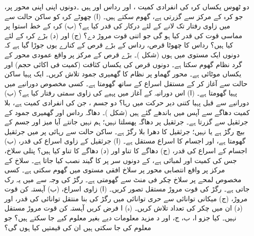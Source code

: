 دو  ٹھوس یکساں کرہ   کی انفرادی کمیت ،  اور رداس  اور  ہیں ۔دونوں اپنی اپنی محور پر، جو کرہ کے مرکز سے گزرتی ہے، گھوم سکتے ہیں۔ (ا)  چھوٹے  کرہ کو ساکن حالت سے   میں  زاوی رفتار تک لانے کے لئے درکار  کی قدر  کیا ہے؟ (ب)  کرہ کے خط استوا  پر مماسی قوت  کی قدر  کیا ہو گی جو اتنی قوت مروڑ دے؟ (ج)  اور (د)  بڑے کرہ کے لئے کیا ہیں؟
رداس  کا چھوٹا قرص،   رداس  کے بڑے قرص کے کنارے    یوں جوڑا گیا ہے  کہ دونوں ایک مستوی میں ہوں (شکل )۔ بڑے قرص کے مرکز   پر واقع عمودی محور  کے گرد   نظام گھوم  سکتا ہے۔ دونوں قرص کی  یکساں کثافت (کمیت فی اکائی حجم)    اور یکساں موٹائی  ہے۔ محور گھماو پر نظام کا گھمیری جمود تلاش کریں۔
ایک پہیا ساکن حالت سے آغاز کر کے  مستقل اسراع  کے ساتھ گھومتا ہے۔ کسی مخصوص  دورانیے میں پہیا  گھومتا ہے۔ (ا)  اس  دورانیہ کے آغاز میں  پہیے کی زاوی سمتی رفتار کیا ہے؟  (ب)   دورانیے سے قبل پہیا کتنی دیر حرکت میں رہا؟
دو جسم ، جن کی انفرادی کمیت  ہے،  بلا کمیت دھاگے سے آپس میں باندھے گئے ہیں (شکل )۔ دھاگہ   رداس اور  گھمیری جمود کے جرثقیل  سے گزرتا ہے۔ جرثقیل پر دھاگہ پھسلتا نہیں؛ ہم نہیں جانتے آیا میز اور جسم کے بیچ رگڑ ہے یا نہیں؛ جرثقیل کا دھرا بلا رگڑ ہے۔ ساکن حالت سے رہائی  پر   میں جرثقیل  گھومتا ہے، اور اجسام کا اسراع مستقل ہے۔ (ا) جرثقیل کے زاوی اسراع کی قدر، (ب) اجسام کے اسراع کی قدر، (ج) دھاگے کا  تناو  اور (د) دھاگے کا تناو   کیا ہیں؟
پتلی سلاخ، جس کی کمیت  اور لمبائی  ہے، کے دونوں سر  پر  کا گیند نصب کیا جاتا ہے۔ سلاخ کے مرکز پر واقع انتصابی محور   پر سلاخ افقی مستوی میں  گھوم سکتی ہے۔ کسی مخصوص لمحے پر سلاخ   چکر فی منٹ  سے گھومتی  ہے۔ رگڑ کی وجہ سے  میں یہ رک جاتی ہے۔ رگڑ کی    قوت مروڑ مستقل تصور کریں۔ (ا) زاوی اسراع، (ب) آہستہ کن قوت مروڑ، (ج) میکانی توانائی سے حری توانائی میں رگڑ کی  بنا منتقل توانائی کی قدر، اور (د) ان  میں چکر کی تعداد تلاش کریں۔ (ہ)  ا فرض کریں آہستہ کن قوت مروڑ مستقل نہیں۔ کیا  جزو ا، ب، ج، اور د مزید معلومات  دیے  بغیر معلوم کیے جا سکتے ہیں؟ جو معلوم کی جا سکتی ہیں  ان کی قیمتیں  کیا ہوں گی؟
